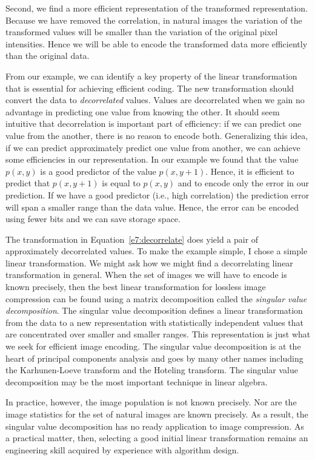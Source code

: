 Second, we find a more efficient representation of the transformed
representation.  Because we have removed the correlation, in natural
images the variation of the transformed values will be smaller than
the variation of the original pixel intensities.  Hence we will be
able to encode the transformed data more efficiently than the original
data.

From our example, we can identify
a key property of the linear transformation
that is essential for achieving efficient coding.
The new transformation should convert the data to {\em decorrelated}
values.  Values are decorrelated when we gain no advantage in
predicting one value from knowing the other.  It should seem intuitive
that decorrelation is important part of efficiency: if we can predict
one value from the another, there is no reason to encode both.
Generalizing this idea, if we can predict approximately predict one
value from another, we can achieve some efficiencies in our
representation.  In our example we found that the value $p(x,y)$ is a
good predictor of the value $p(x,y+1)$.  Hence, it is efficient to
predict that $p(x,y+1)$ is equal to $p(x,y)$ and to encode only the
error in our prediction.  If we have a good predictor (i.e., high
correlation) the prediction error will span a smaller range than the
data value.  Hence, the error can be encoded using fewer bits and we
can save storage space.

The transformation in Equation~\ref{e7:decorrelate} does yield a pair
of approximately decorrelated values.  To make the example simple, I
chose a simple linear transformation.  We might ask how we might find
a decorrelating linear transformation in general.  When the set of
images we will have to encode is known precisely, then the best linear
transformation for lossless image compression can be found using a
matrix decomposition called the {\em singular value decomposition}.
The singular value decomposition defines a linear transformation from
the data to a new representation with statistically independent values
that are concentrated over smaller and smaller ranges.  This
representation is just what we seek for efficient image encoding.  The
singular value decomposition is at the heart of principal components
analysis and goes by many other names including the Karhunen-Loeve
transform and the Hoteling transform.  The singular value
decomposition may be the most important technique in linear algebra.

In practice, however, the image population is not known precisely.
Nor are the image statistics for the set of natural images are known
precisely.  As a result, the singular value decomposition has no ready
application to image compression.  As a practical matter, then,
selecting a good initial linear transformation remains an
engineering skill acquired by experience with algorithm design.

